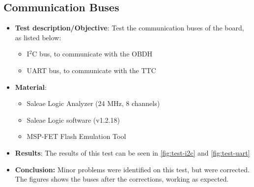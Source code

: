 \subsection{Communication Buses}

\begin{itemize}
    \item \textbf{Test description/Objective}: Test the communication buses of the board, as listed below:
        \begin{itemize}
            \item I$^{2}$C bus, to communicate with the OBDH
            \item UART bus, to communicate with the TTC
        \end{itemize}
    \item \textbf{Material}:
        \begin{itemize}
            \item Saleae Logic Analyzer (24 MHz, 8 channels)
            \item Saleae Logic software (v1.2.18)
            \item MSP-FET Flash Emulation Tool
        \end{itemize}
    \item \textbf{Results}: The results of this test can be seen in \autoref{fig:test-i2c} and \autoref{fig:test-uart}
    \item \textbf{Conclusion:} Minor problems were identified on this test, but were corrected. The figures shows the buses after the corrections, working as expected.
\end{itemize}

